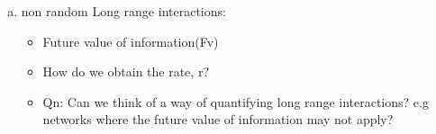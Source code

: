 \documentclass[12pt,a4paper]{article}
\begin{document}

\begin{enumerate}[a)]
\item non random Long range interactions:
\begin{itemize}
\item Future value of information(Fv)
\item How do we obtain the rate, r?
\item Qn: Can we think of a way of quantifying long range interactions? e.g networks where the future value of information may not apply?
\end{itemize}

\end{enumerate}
\end{document}
